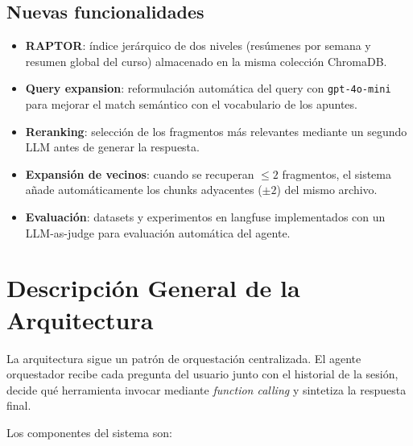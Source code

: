 \documentclass[conference]{IEEEtran}
\begin{document}
\subsection{Nuevas funcionalidades}

\begin{itemize}
    \item \textbf{RAPTOR}: índice jerárquico de dos niveles (resúmenes por semana y resumen global del curso) almacenado en la misma colección ChromaDB.
    \item \textbf{Query expansion}: reformulación automática del query con \texttt{gpt-4o-mini} para mejorar el match semántico con el vocabulario de los apuntes.
    \item \textbf{Reranking}: selección de los fragmentos más relevantes mediante un segundo LLM antes de generar la respuesta.
    \item \textbf{Expansión de vecinos}: cuando se recuperan $\leq 2$ fragmentos, el sistema añade automáticamente los chunks adyacentes ($\pm 2$) del mismo archivo.
    \item \textbf{Evaluación}: datasets y experimentos en langfuse implementados con un LLM-as-judge para evaluación automática del agente.
\end{itemize}

\section{Descripción General de la Arquitectura}

La arquitectura sigue un patrón de orquestación centralizada. El agente orquestador recibe cada pregunta del usuario junto con el historial de la sesión, decide qué herramienta invocar mediante \textit{function calling} y sintetiza la respuesta final.

Los componentes del sistema son:
\end{document}
